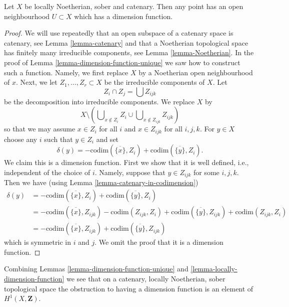\begin{lemma}
\label{lemma-locally-dimension-function}
Let $X$ be locally Noetherian, sober and catenary.
Then any point has an open neighbourhood
$U \subset X$ which has a dimension function.
\end{lemma}

\begin{proof}
We will use repeatedly
that an open subspace of a catenary space is catenary, see
Lemma \ref{lemma-catenary} and that a Noetherian topological space
has finitely many irreducible components, see Lemma \ref{lemma-Noetherian}.
In the proof of Lemma \ref{lemma-dimension-function-unique} we saw how to
construct such a function. Namely, we first replace $X$ by a Noetherian
open neighbourhood of $x$. Next, we let $Z_1, \ldots, Z_r \subset X$
be the irreducible components of $X$. Let
$$
Z_i \cap Z_j = \bigcup Z_{ijk}
$$
be the decomposition into irreducible components. We replace
$X$ by
$$
X \setminus \left(
\bigcup\nolimits_{x \not \in Z_i} Z_i
\cup
\bigcup\nolimits_{x \not \in Z_{ijk}} Z_{ijk}
\right)
$$
so that we may assume $x \in Z_i$ for all $i$ and
$x \in Z_{ijk}$ for all $i, j, k$. For $y \in X$ choose any
$i$ such that $y \in Z_i$ and set
$$
\delta(y) = - \text{codim}(\overline{\{x\}}, Z_i)
+ \text{codim}(\overline{\{y\}}, Z_i).
$$
We claim this is a dimension function. First we show that it
is well defined, i.e., independent of the choice of $i$.
Namely, suppose that $y \in Z_{ijk}$ for some $i, j, k$.
Then we have (using Lemma \ref{lemma-catenary-in-codimension})
\begin{align*}
\delta(y) & =
- \text{codim}(\overline{\{x\}}, Z_i)
+ \text{codim}(\overline{\{y\}}, Z_i) \\
& =
- \text{codim}(\overline{\{x\}}, Z_{ijk})
- \text{codim}(Z_{ijk}, Z_i)
+ \text{codim}(\overline{\{y\}}, Z_{ijk})
+ \text{codim}(Z_{ijk}, Z_i) \\
& =
- \text{codim}(\overline{\{x\}}, Z_{ijk})
+ \text{codim}(\overline{\{y\}}, Z_{ijk})
\end{align*}
which is symmetric in $i$ and $j$.
We omit the proof that it is a dimension function.
\end{proof}

\begin{remark}
\label{remark-obstruction-to-dimension-function}
Combining Lemmas \ref{lemma-dimension-function-unique} and
\ref{lemma-locally-dimension-function} we see that on a catenary,
locally Noetherian, sober topological space the obstruction to
having a dimension function is an element of
$H^1(X, \mathbf{Z})$.
\end{remark}



